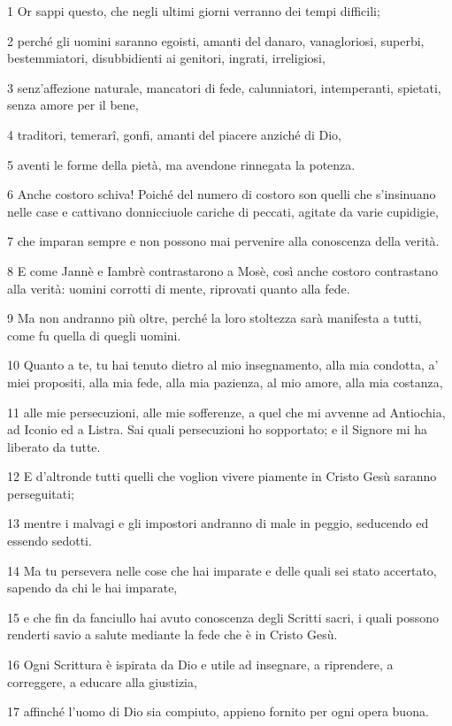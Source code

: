 \par 1 Or sappi questo, che negli ultimi giorni verranno dei tempi difficili;
\par 2 perché gli uomini saranno egoisti, amanti del danaro, vanagloriosi, superbi, bestemmiatori, disubbidienti ai genitori, ingrati, irreligiosi,
\par 3 senz'affezione naturale, mancatori di fede, calunniatori, intemperanti, spietati, senza amore per il bene,
\par 4 traditori, temerarî, gonfi, amanti del piacere anziché di Dio,
\par 5 aventi le forme della pietà, ma avendone rinnegata la potenza.
\par 6 Anche costoro schiva! Poiché del numero di costoro son quelli che s'insinuano nelle case e cattivano donnicciuole cariche di peccati, agitate da varie cupidigie,
\par 7 che imparan sempre e non possono mai pervenire alla conoscenza della verità.
\par 8 E come Jannè e Iambrè contrastarono a Mosè, così anche costoro contrastano alla verità: uomini corrotti di mente, riprovati quanto alla fede.
\par 9 Ma non andranno più oltre, perché la loro stoltezza sarà manifesta a tutti, come fu quella di quegli uomini.
\par 10 Quanto a te, tu hai tenuto dietro al mio insegnamento, alla mia condotta, a' miei propositi, alla mia fede, alla mia pazienza, al mio amore, alla mia costanza,
\par 11 alle mie persecuzioni, alle mie sofferenze, a quel che mi avvenne ad Antiochia, ad Iconio ed a Listra. Sai quali persecuzioni ho sopportato; e il Signore mi ha liberato da tutte.
\par 12 E d'altronde tutti quelli che voglion vivere piamente in Cristo Gesù saranno perseguitati;
\par 13 mentre i malvagi e gli impostori andranno di male in peggio, seducendo ed essendo sedotti.
\par 14 Ma tu persevera nelle cose che hai imparate e delle quali sei stato accertato, sapendo da chi le hai imparate,
\par 15 e che fin da fanciullo hai avuto conoscenza degli Scritti sacri, i quali possono renderti savio a salute mediante la fede che è in Cristo Gesù.
\par 16 Ogni Scrittura è ispirata da Dio e utile ad insegnare, a riprendere, a correggere, a educare alla giustizia,
\par 17 affinché l'uomo di Dio sia compiuto, appieno fornito per ogni opera buona.

